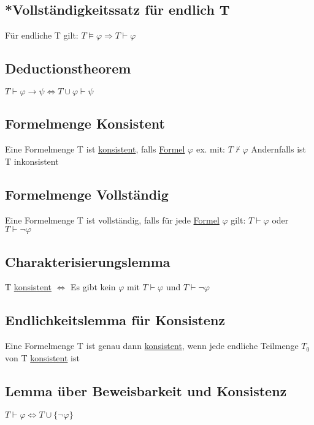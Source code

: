 \documentclass[12pt,a4paper]{article} %
\begin{document}
	\subsection{*Vollständigkeitssatz für endlich T}
	Für endliche T gilt: $T \hyperref[Erfullbar]{\vDash} \varphi \Rightarrow T \hyperref[Beweisbar]{\vdash} \varphi$
	
	\subsection{Deductionstheorem}
	$T \hyperref[Beweisbar]{\vdash} \varphi \rightarrow \psi \Leftrightarrow T \cup \varphi \hyperref[Beweisbar]{\vdash} \psi$
	
	\subsection{Formelmenge Konsistent}
	Eine Formelmenge T ist \hyperref[ALKonsistent]{konsistent}, falls \hyperref[Formel]{Formel} $\varphi$ ex. mit: $T \nvdash \varphi$ Andernfalls ist T inkonsistent
	
	\subsection{Formelmenge Vollständig}
	Eine Formelmenge T ist vollständig, falls für jede \hyperref[Formel]{Formel} $\varphi$ gilt: $T \hyperref[Beweisbar]{\vdash} \varphi$ oder $T \hyperref[Beweisbar]{\vdash} \neg \varphi$
	
	\subsection{Charakterisierungslemma}
	T \hyperref[ALKonsistent]{konsistent} $\Leftrightarrow$ Es gibt kein $\varphi$ mit $T \hyperref[Beweisbar]{\vdash} \varphi$ und $T \hyperref[Beweisbar]{\vdash} \neg \varphi$
	
	\subsection{Endlichkeitslemma für Konsistenz}
	Eine Formelmenge T ist genau dann \hyperref[ALKonsistent]{konsistent}, wenn jede endliche Teilmenge $T_0$ von T \hyperref[ALKonsistent]{konsistent} ist
	
	\subsection{Lemma über Beweisbarkeit und Konsistenz}
	$T \hyperref[Beweisbar]{\vdash} \varphi \Leftrightarrow T \cup \{\neg \varphi\}$
	
\end{document}
